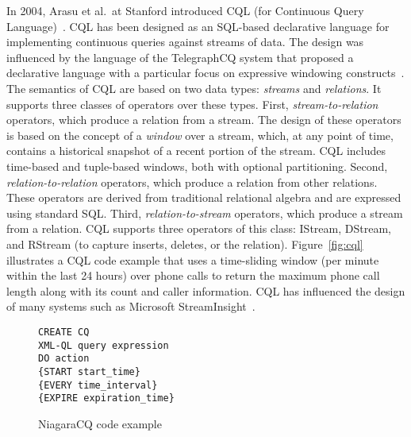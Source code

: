 In 2004, Arasu et al.\ at Stanford introduced CQL (for Continuous
Query Language)~\cite{arasu_widom_2004}. CQL has been designed as an
SQL-based declarative language for implementing continuous queries
against streams of data. The design was influenced by the language of
the TelegraphCQ system that proposed a declarative language with a
particular focus on expressive windowing
constructs~\cite{chandrasekaran_et_al_2003}. The semantics of CQL are
based on two data types: \emph{streams} and \emph{relations}. It
supports three classes of operators over these types. First,
\emph{stream-to-relation} operators, which produce a relation from a
stream.  The design of these operators is based on the concept of a
\emph{window} over a stream, which, at any point of time, contains a
historical snapshot of a recent portion of the stream. CQL includes
time-based and tuple-based windows, both with optional
partitioning. Second, \emph{relation-to-relation} operators, which
produce a relation from other relations. These operators are derived
from traditional relational algebra and are expressed using standard
SQL. Third, \emph{relation-to-stream} operators, which produce a
stream from a relation. CQL supports three operators of this class:
IStream, DStream, and RStream (to capture inserts, deletes, or the
relation).  Figure~\ref{fig:cql} illustrates a CQL code example that
uses a time-sliding window (per minute within the last 24 hours) over
phone calls to return the maximum phone call length along with its
count and caller information. CQL has influenced the design of many
systems such as Microsoft StreamInsight~\cite{ali_et_al_2009}.

\begin{figure}
\begin{lstlisting}
CREATE CQ
XML-QL query expression
DO action
{START start_time} 
{EVERY time_interval} 
{EXPIRE expiration_time}
\end{lstlisting}
\caption{\label{fig:Niagra}NiagaraCQ code example}
\end{figure}

